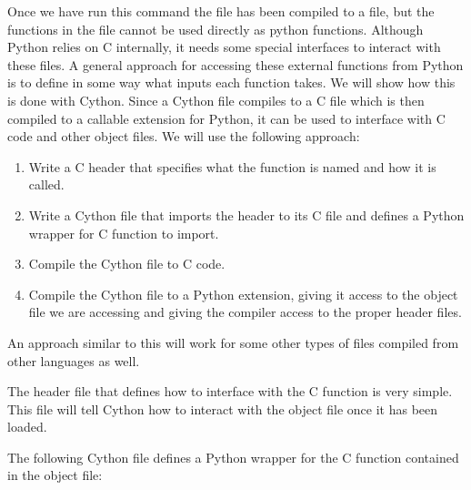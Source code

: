 Once we have run this command the file has been compiled to a \of file, but the functions in the \of file cannot be used directly as python functions.
Although Python relies on C internally, it needs some special interfaces to interact with these \of files.
A general approach for accessing these external functions from Python is to define in some way what inputs each function takes.
We will show how this is done with Cython.
Since a Cython file compiles to a C file which is then compiled to a callable extension for Python, it can be used to interface with C code and other object files.
We will use the following approach:
\begin{enumerate}
\item Write a C header that specifies what the function is named and how it is called.
\item Write a Cython file that imports the header to its C file and defines a Python wrapper for C function to import.
\item Compile the Cython file to C code.
\item Compile the Cython file to a Python extension, giving it access to the object file we are accessing and giving the compiler access to the proper header files.
\end{enumerate}

An approach similar to this will work for some other types of \of files compiled from other languages as well.

The header file that defines how to interface with the C function is very simple. 
This file will tell Cython how to interact with the object file once it has been loaded.




The following Cython file defines a Python wrapper for the C function contained in the object file:



